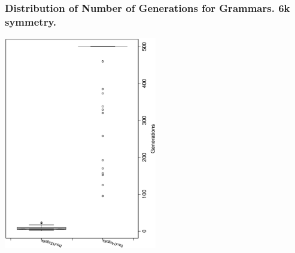  \begin{frame}
 \frametitle{ Distribution of Number of Generations for Grammars. 6k  symmetry. }
 \begin{center}
\includegraphics[width=0.5\textwidth, angle=-90]
{ExpEboxplottGenerations004.eps}
 \end{center}
 \label{ExpEboxplottGenerations004.eps}  
 \end{frame}

